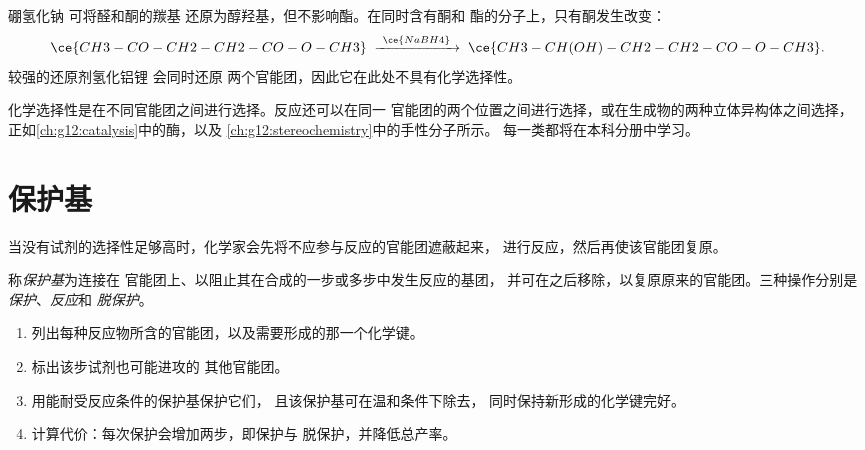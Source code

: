 \begin{example}[有选择性的还原剂]\label{ex:g12:synthesis-strategy:nabh4}
硼氢化钠  可将醛和酮的羰基
还原为醇羟基，但不影响酯。在同时含有酮和
酯的分子上，只有酮发生改变：
\[
  \ce{CH3-CO-CH2-CH2-CO-O-CH3}
  \;\xrightarrow{\ \ce{NaBH4}\ }\;
  \ce{CH3-CH(OH)-CH2-CH2-CO-O-CH3} .
\]
较强的还原剂氢化铝锂  会同时还原
两个官能团，因此它在此处不具有化学选择性。
\end{example}

\begin{remark}[选择性的几种类型]\label{rem:g12:synthesis-strategy:kinds}
化学选择性是在不同官能团之间进行选择。反应还可以在同一
官能团的两个位置之间进行选择，或在生成物的两种立体异构体之间选择，
正如\cref{ch:g12:catalysis}中的酶，以及
\cref{ch:g12:stereochemistry}中的手性分子所示。
每一类都将在本科分册中学习。
\end{remark}

\section{保护基}

当没有试剂的选择性足够高时，化学家会先将不应参与反应的官能团遮蔽起来，
进行反应，然后再使该官能团复原。

\begin{definition}[保护基]\label{def:g12:synthesis-strategy:protecting-group}
称\emph{保护基}为连接在
官能团上、以阻止其在合成的一步或多步中发生反应的基团，
并可在之后移除，以复原原来的官能团。三种操作分别是
\emph{保护}、\emph{反应}和
\emph{脱保护}。
\end{definition}

\begin{method}[设计保护方案]\label{met:g12:synthesis-strategy:plan}
\begin{enumerate}
  \item 列出每种反应物所含的官能团，以及需要形成的那一个化学键。
  \item 标出该步试剂也可能进攻的
        其他官能团。
  \item 用能耐受反应条件的保护基保护它们，
        且该保护基可在温和条件下除去，
        同时保持新形成的化学键完好。
  \item 计算代价：每次保护会增加两步，即保护与
        脱保护，并降低总产率。
\end{enumerate}
\end{method}

